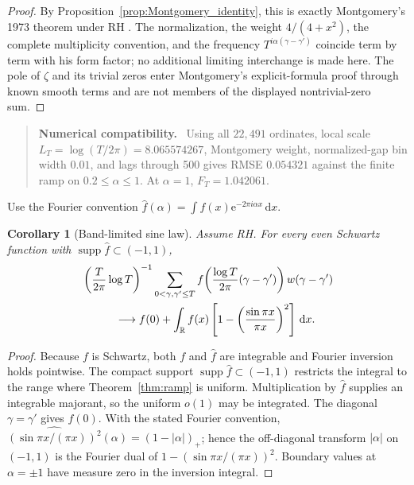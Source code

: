 \documentclass[11pt]{amsart}
\newtheorem{corollary}[theorem]{Corollary}
\theoremstyle{definition}
\theoremstyle{remark}
\newcommand{\dd}{\,\mathrm d}
\newcommand{\ee}{\mathrm e}
\newcommand{\supp}{\operatorname{supp}}
\newenvironment{numericalcheck}
{\begin{quote}\small\noindent\textbf{Numerical compatibility.}\ }{\end{quote}}
\begin{document}
\begin{proof}
By Proposition~\ref{prop:Montgomery_identity}, this is exactly Montgomery's
1973 theorem under RH \cite{Montgomery1973}.  The normalization, the weight
$4/(4+x^2)$, the complete multiplicity convention, and the frequency
$T^{i\alpha(\gamma-\gamma')}$ coincide term by term with his form factor; no
additional limiting interchange is made here.  The pole of $\zeta$ and its
trivial zeros enter Montgomery's explicit-formula proof through known smooth
terms and are not members of the displayed nontrivial-zero sum.
\end{proof}

\begin{numericalcheck}
Using all $22{,}491$ ordinates, local scale
$L_T=\log(T/2\pi)=8.065574267$, Montgomery weight, normalized-gap bin width
$0.01$, and lags through 500 gives RMSE $0.054321$ against the finite ramp on
$0.2\le\alpha\le1$.  At $\alpha=1$, $F_T=1.042061$.
\end{numericalcheck}

Use the Fourier convention
$\widehat f(\alpha)=\int f(x)\ee^{-2\pi i\alpha x}\dd x$.

\begin{corollary}[Band-limited sine law]\label{cor:band_sine}
Assume RH.  For every even Schwartz function with
$\supp\widehat f\subset(-1,1)$,
\begin{align}
&\left(\frac{T}{2\pi}\log T\right)^{-1}
\sum_{0<\gamma,\gamma'\leq T}
f\!\left(\frac{\log T}{2\pi}(\gamma-\gamma')\right)
w(\gamma-\gamma')\notag\\
&\hspace{3em}\longrightarrow
f(0)+\int_{\mathbb R}f(x)
\left[1-\left(\frac{\sin\pi x}{\pi x}\right)^2\right]\dd x.
\label{eq:band_sine}
\end{align}
\end{corollary}

\begin{proof}
Because $f$ is Schwartz, both $f$ and $\widehat f$ are integrable and Fourier
inversion holds pointwise.  The compact support
$\supp\widehat f\subset(-1,1)$ restricts the integral to the range where
Theorem~\ref{thm:ramp} is uniform.  Multiplication by $\widehat f$ supplies an
integrable majorant, so the uniform $o(1)$ may be integrated.  The diagonal
$\gamma=\gamma'$ gives $f(0)$.  With the stated Fourier convention,
$\widehat{(\sin\pi x/(\pi x))^2}(\alpha)=(1-|\alpha|)_+$; hence the
off-diagonal transform $|\alpha|$ on $(-1,1)$ is the Fourier dual of
$1-(\sin\pi x/(\pi x))^2$.  Boundary values at $\alpha=\pm1$ have measure zero
in the inversion integral.
\end{proof}
\end{document}
